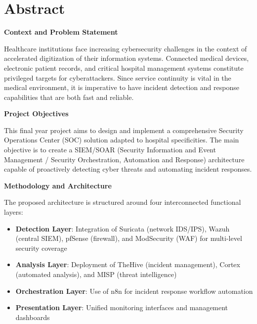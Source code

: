 \chapter*{Abstract}

\vspace{1cm}

\textbf{Context and Problem Statement}

Healthcare institutions face increasing cybersecurity challenges in the context of accelerated digitization of their information systems. Connected medical devices, electronic patient records, and critical hospital management systems constitute privileged targets for cyberattackers. Since service continuity is vital in the medical environment, it is imperative to have incident detection and response capabilities that are both fast and reliable.

\vspace{0.5cm}

\textbf{Project Objectives}

This final year project aims to design and implement a comprehensive Security Operations Center (SOC) solution adapted to hospital specificities. The main objective is to create a SIEM/SOAR (Security Information and Event Management / Security Orchestration, Automation and Response) architecture capable of proactively detecting cyber threats and automating incident responses.
\vspace{0.5cm}

\textbf{Methodology and Architecture}

The proposed architecture is structured around four interconnected functional layers:

\begin{itemize}
    \item \textbf{Detection Layer}: Integration of Suricata (network IDS/IPS), Wazuh (central SIEM), pfSense (firewall), and ModSecurity (WAF) for multi-level security coverage
    \item \textbf{Analysis Layer}: Deployment of TheHive (incident management), Cortex (automated analysis), and MISP (threat intelligence)
    \item \textbf{Orchestration Layer}: Use of n8n for incident response workflow automation
    \item \textbf{Presentation Layer}: Unified monitoring interfaces and management dashboards
\end{itemize}

\vspace{0.5cm}

